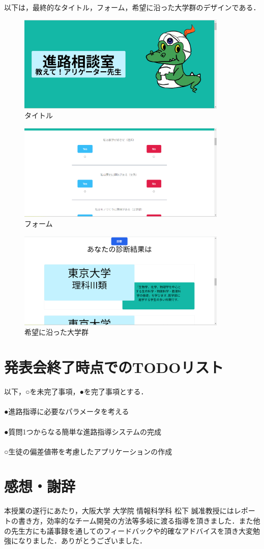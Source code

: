 \documentclass[a4j，titlepage]{jarticle}
\begin{document}
以下は，最終的なタイトル，フォーム，希望に沿った大学群のデザインである．
\begin{figure}[htbp]
  \begin{center}
  \includegraphics[width=100mm]{title.png}
  \caption{タイトル}
  \end{center}
\end{figure}
\begin{figure}[htbp]
  \begin{center}
  \includegraphics[width=100mm]{form.png}
  \caption{フォーム}
  \end{center}
\end{figure}
\begin{figure}[htbp]
  \begin{center}
  \includegraphics[width=100mm]{univs.png}
  \caption{希望に沿った大学群}
  \end{center}
\end{figure}
\section{発表会終了時点でのTODOリスト}
以下，○を未完了事項，●を完了事項とする．\\
\\
●進路指導に必要なパラメータを考える\\
\\
●質問1つからなる簡単な進路指導システムの完成\\
\\
○生徒の偏差値帯を考慮したアプリケーションの作成\\

\section{感想・謝辞}
本授業の遂行にあたり，大阪大学 大学院 情報科学科 松下 誠准教授にはレポートの書き方，効率的なチーム開発の方法等多岐に渡る指導を頂きました．また他の先生方にも議事録を通してのフィードバックや的確なアドバイスを頂き大変勉強になりました．ありがとうございました．
\end{document}
